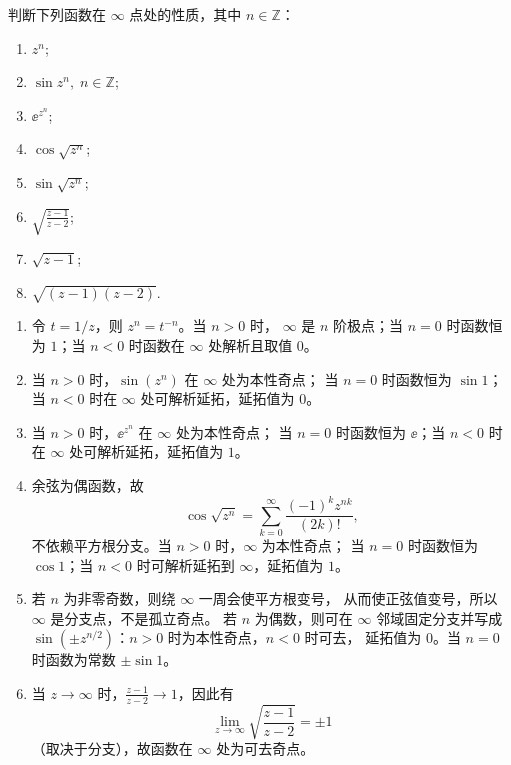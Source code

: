 
\begin{question}
判断下列函数在 \(\infty\) 点处的性质，其中 \(n\in\mathbb{Z}\)：

\begin{enumerate}
\item \(z^n\);
\item \(\sin z^n,\; n\in\mathbb{Z}\);
\item \(\ee^{z^n}\);
\item \(\cos\sqrt{z^n}\);
\item \(\sin\sqrt{z^n}\);
\item \(\displaystyle\sqrt{\frac{z-1}{z-2}}\);
\item \(\sqrt{z-1}\);
\item \(\sqrt{(z-1)(z-2)}\).
\end{enumerate}

\begin{solution}
\begin{enumerate}
  \item 令 \(t=1/z\)，则 \(z^n=t^{-n}\)。当 \(n>0\) 时，
  \(\infty\) 是 \(n\) 阶极点；当 \(n=0\) 时函数恒为 \(1\)；当
  \(n<0\) 时函数在 \(\infty\) 处解析且取值 \(0\)。

  \item 当 \(n>0\) 时，\(\sin(z^n)\) 在 \(\infty\) 处为本性奇点；
  当 \(n=0\) 时函数恒为 \(\sin1\)；当 \(n<0\) 时在 \(\infty\)
  处可解析延拓，延拓值为 \(0\)。

  \item 当 \(n>0\) 时，\(\ee^{z^n}\) 在 \(\infty\) 处为本性奇点；
  当 \(n=0\) 时函数恒为 \(\ee\)；当 \(n<0\) 时在 \(\infty\)
  处可解析延拓，延拓值为 \(1\)。

  \item 余弦为偶函数，故
  \[
  \cos\sqrt{z^n}
  =\sum_{k=0}^{\infty}\frac{(-1)^kz^{nk}}{(2k)!},
  \]
  不依赖平方根分支。当 \(n>0\) 时，\(\infty\) 为本性奇点；
  当 \(n=0\) 时函数恒为 \(\cos1\)；当 \(n<0\) 时可解析延拓到
  \(\infty\)，延拓值为 \(1\)。

  \item 若 \(n\) 为非零奇数，则绕 \(\infty\) 一周会使平方根变号，
  从而使正弦值变号，所以 \(\infty\) 是分支点，不是孤立奇点。
  若 \(n\) 为偶数，则可在 \(\infty\) 邻域固定分支并写成
  \(\sin(\pm z^{n/2})\)：\(n>0\) 时为本性奇点，\(n<0\) 时可去，
  延拓值为 \(0\)。当 \(n=0\) 时函数为常数 \(\pm\sin1\)。

  \item 当 \(z\to\infty\) 时，\(\displaystyle\frac{z-1}{z-2}\to 1\)，因此有
   \[
   \lim_{z\to\infty} \sqrt{\frac{z-1}{z-2}} = \pm 1
   \]
   （取决于分支），故函数在 \(\infty\) 处为可去奇点。


\end{enumerate}
\end{solution}
\end{question}
